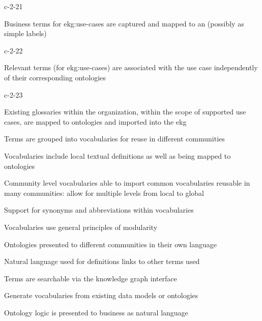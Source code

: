 \ekgmmCapabilitySectionLevelsOneFive

\begin{level-assessment}{c-2-2}{1}

  \item Business terms for \glspl{ekg:use-case} are captured and mapped to an 
        (possibly as simple labels)

\end{level-assessment}

\begin{level-assessment}{c-2-2}{2}

  \item Relevant terms (for \glspl{ekg:use-case}) are associated with the use case independently of
  their corresponding ontologies

\end{level-assessment}

\begin{level-assessment}{c-2-2}{3}

  \item Existing glossaries within the organization, within the scope of supported use cases,
        are mapped to ontologies and imported into the \gls{ekg}
  \item Terms are grouped into vocabularies for reuse in different communities
  \item Vocabularies include local textual definitions as well as being mapped to ontologies
  \item Community level vocabularies able to import common vocabularies reusable in many communities:
        allow for multiple levels from local to global
  \item Support for synonyms and abbreviations within vocabularies
  \item Vocabularies use general principles of modularity
  \item Ontologies presented to different communities in their own language
  \item Natural language used for definitions links to other terms used
  \item Terms are searchable via the knowledge graph interface
  \item Generate vocabularies from existing data models or ontologies
  \item Ontology logic is presented to business as natural language

\end{level-assessment}

